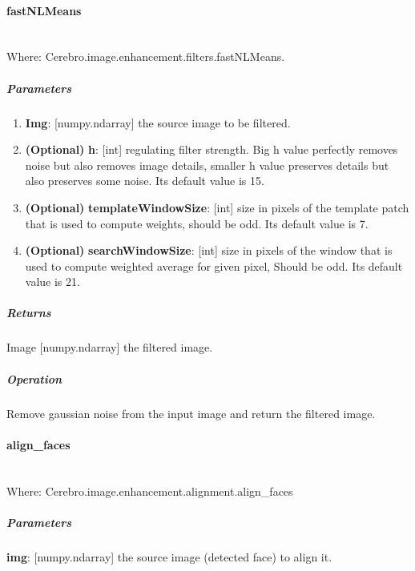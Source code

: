 \paragraph{fastNLMeans} \mbox{} \\
Where: Cerebro.image.enhancement.filters.fastNLMeans.
\subparagraph{Parameters}
\begin{changemargin}{0.5cm}{0cm}
	\begin{enumerate} 
		\item \textbf{Img}: [numpy.ndarray] the source image to be filtered.
		\item \textbf{(Optional)} \textbf{h}: [int] regulating filter strength. Big h value perfectly removes noise but also removes image details, smaller h value preserves details but also preserves some noise. Its default value is 15.
		\item \textbf{(Optional)} \textbf{templateWindowSize}: [int] size in pixels of the template patch that is used to compute weights, should be odd. \newline Its default value is 7.
		\item \textbf{(Optional)} \textbf{searchWindowSize}: [int] size in pixels of the window that is used to compute weighted average for given pixel, Should be odd. \newline Its default value is 21.
	\end{enumerate}
\end{changemargin}

\subparagraph{Returns}
\begin{changemargin}{1cm}{0cm}
	Image [numpy.ndarray] the filtered image.
\end{changemargin}

\subparagraph{Operation}
\begin{changemargin}{1cm}{0cm}
	Remove gaussian noise from the input image and return the filtered image.
\end{changemargin}
\hrulefill

\paragraph{align\_faces} \mbox{} \\
Where: Cerebro.image.enhancement.alignment.align\_faces
\subparagraph{Parameters}
\begin{changemargin}{1cm}{0cm}
	\textbf{img}: [numpy.ndarray] the source image (detected face) to align it.
\end{changemargin}

